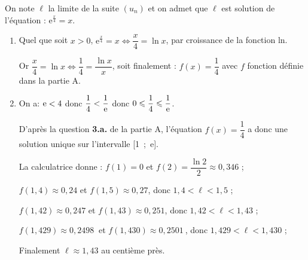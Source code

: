 \documentclass[10pt]{article}
\providecommand{\np}[2][]{{#2~#1}}
\begin{document}
On note $\ell$ la limite de la suite $\left(u_n\right)$ et on admet que $\ell$ est solution de l'équation :
$\text{e}^{\frac{x}{4}} = x.$

\begin{enumerate}[resume]
\item 
Quel que soit $x > 0$, \:$\text{e}^{\frac{x}{4}} = x \iff \dfrac{x}{4} = \ln x$, par croissance de la fonction ln.

Or $\dfrac{x}{4} = \ln x \iff \dfrac14 = \dfrac{\ln x}{x}$, soit finalement :
$f(x) = \dfrac14$ avec $f$ fonction définie dans la partie A.

\item 

On a: $\text e <4$ donc $\dfrac{1}{4} < \dfrac{1}{\text e}$ donc $0\leqslant \dfrac{1}{4} \leqslant \dfrac{1}{\text e}$.

D'après la question \textbf{3.\:a.} de la partie A, l'équation $f(x) = \dfrac14$ a donc une solution unique sur l'intervalle [1~;~e].

La calculatrice donne : $f(1) = 0$ et $f(2) = \dfrac{\ln 2}{2} \approx 0,346$ ;

$f(1,4) \approx 0,24$ et $f(1,5) \approx 0,27$, donc $1,4 < \ell < 1,5$ ;

$f(1,42) \approx 0,247$ et $f(1,43) \approx 0,251$, donc $1,42 < \ell < 1,43$ ;

$f(1,429) \approx \np{0,2498}$ et $f(1,430) \approx \np{0,2501}$, donc $1,429 < \ell < 1,430$ ;

Finalement $\ell \approx 1,43$ au centième près.
\end{enumerate}

\bigskip
\end{document}
